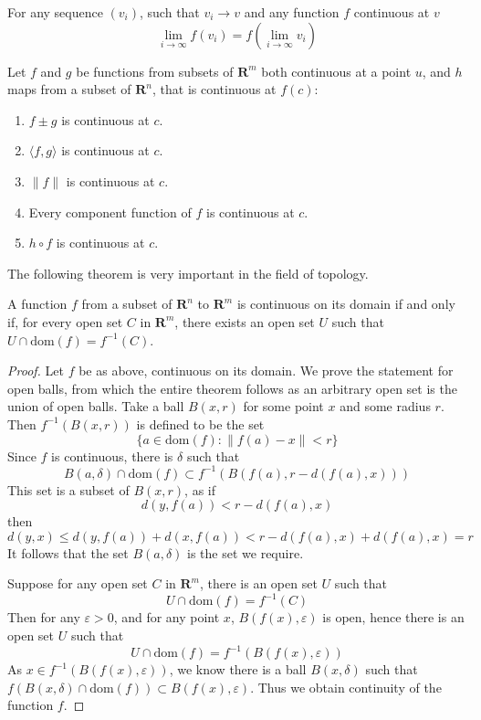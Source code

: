 \begin{lemma}
  For any sequence $(v_i)$, such that $v_i \to v$ and any function $f$ continuous at $v$
  \[ \lim_{i \to \infty} f(v_i) = f(\lim_{i \to \infty} v_i) \]
\end{lemma}

\begin{lemma}
  Let $f$ and $g$ be functions from subsets of $\mathbf{R}^m$ both continuous at a point $u$, and $h$ maps from a subset of $\mathbf{R}^n$, that is continuous at $f(c)$:

  \begin{enumerate}
    \item $f \pm g$ is continuous at $c$.
    \item $\langle f, g \rangle$ is continuous at $c$.
    \item $\|f\|$ is continuous at $c$.
    \item Every component function of $f$ is continuous at $c$.
    \item $h \circ f$ is continuous at $c$.
  \end{enumerate}
\end{lemma}

The following theorem is very important in the field of topology.

\begin{theorem}
  A function $f$ from a subset of $\mathbf{R}^n$ to $\mathbf{R}^m$ is continuous on its domain if and only if, for every open set $C$ in $\mathbf{R}^m$, there exists an open set $U$ such that $U \cap \text{dom}(f) = f^{-1}(C)$.
\end{theorem}
\begin{proof}
  Let $f$ be as above, continuous on its domain. We prove the statement for open balls, from which the entire theorem follows as an arbitrary open set is the union of open balls. Take a ball $B(x,r)$ for some point $x$ and some radius $r$. Then $f^{-1}(B(x,r))$ is defined to be the set
  \[ \{ a \in \text{dom}(f) : \| f(a) - x \| < r \} \]
  Since $f$ is continuous, there is $\delta$ such that
  \[ B(a,\delta) \cap \text{dom}(f) \subset f^{-1}(B(f(a),r - d(f(a), x))) \]
  This set is a subset of $B(x,r)$, as if
  \[ d(y, f(a)) < r - d(f(a), x) \]
  then
  \[ d(y, x) \leq d(y, f(a)) + d(x, f(a)) < r - d(f(a), x) + d(f(a), x) = r \]
  It follows that the set $B(a,\delta)$ is the set we require.

  Suppose for any open set $C$ in $\mathbf{R}^m$, there is an open set $U$ such that
  \[ U \cap \text{dom}(f) = f^{-1}(C) \]
  Then for any $\varepsilon > 0$, and for any point $x$, $B(f(x), \varepsilon)$ is open, hence there is an open set $U$ such that
  \[ U \cap \text{dom}(f) = f^{-1}(B(f(x), \varepsilon)) \]
  As $x \in f^{-1}(B(f(x), \varepsilon))$, we know there is a ball $B(x, \delta)$ such that $f(B(x, \delta) \cap \text{dom}(f)) \subset B(f(x), \varepsilon)$. Thus we obtain continuity of the function $f$.
\end{proof}


